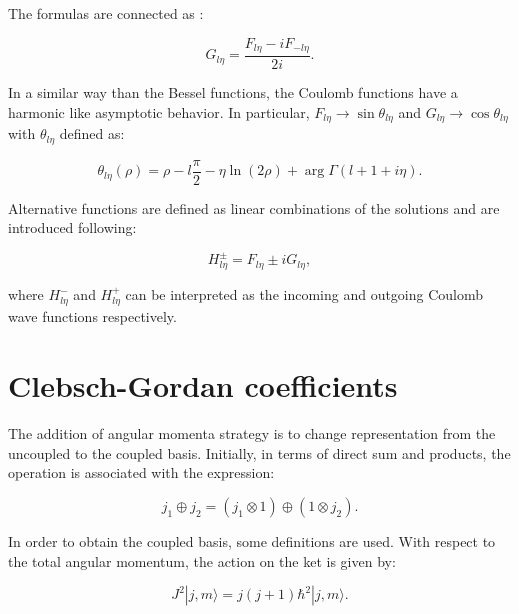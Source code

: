 \documentclass[openany]{book}
\begin{document}
The formulas are connected as \cite{gaspard_2018}:

\begin{equation}  \label{eq:special_coulomb_connection}
	G_{l\eta} = \frac{F_{l\eta} - iF_{-l\eta} }{2i}.
\end{equation}

In a similar way than the Bessel functions, the Coulomb functions have a harmonic like asymptotic behavior. In particular,  $F_{l\eta} \rightarrow \sin{\theta_{l\eta}}$ and $G_{l\eta} \rightarrow \cos{\theta_{l\eta}}$ with $\theta_{l\eta}$ defined as:

\begin{equation} \label{eq:special_coulomb_theta}
	\theta_{l\eta}(\rho) = \rho -  l\frac{\pi}{2}  - \eta\ln{(2\rho)} +  \arg\Gamma(l+ 1+i\eta).
\end{equation}

Alternative functions are defined as linear combinations of the solutions and are introduced following:

\begin{equation}\label{eq:special_coulomb_hankel}
	H^{\pm}_{l\eta} = F_{l\eta} \pm iG_{l\eta},
\end{equation}

where $H^{-}_{l\eta}$ and $H^{+}_{l\eta}$ can be interpreted as the incoming and outgoing Coulomb wave functions respectively. 

\section{Clebsch-Gordan coefficients} \label{sec:clebschGordan}

The addition of angular momenta strategy is to change  representation from the uncoupled to the coupled basis. Initially, in terms of direct sum and products, the operation is associated with the expression: 

\begin{equation}\label{eq:angularMomentum_tensorProduct_addition}
	j_1 \oplus j_2 = (j_1 \otimes 1) \oplus  (1 \otimes j_2).
\end{equation}

In order to obtain the coupled basis, some definitions are used. With respect to the total angular momentum, the action on the ket is given by:

\begin{equation}\label{eq:angularMomentum_J2}
	J^2|j, m \rangle  = j(j+1)\hbar^2| j, m \rangle. 
\end{equation}
\end{document}
